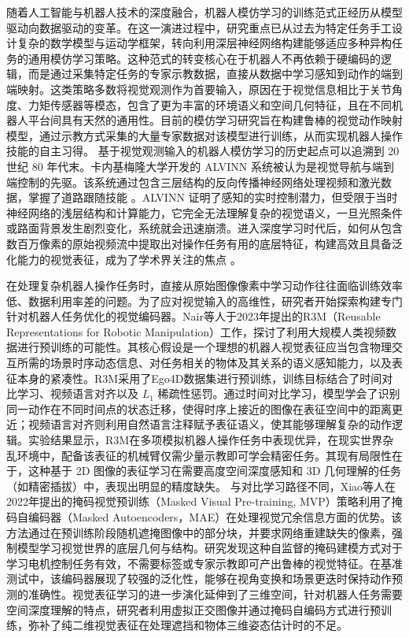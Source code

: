 随着人工智能与机器人技术的深度融合，机器人模仿学习的训练范式正经历从模型驱动向数据驱动的变革。在这一演进过程中，研究重点已从过去为特定任务手工设计复杂的数学模型与运动学框架，转向利用深层神经网络构建能够适应多种异构任务的通用模仿学习策略。这种范式的转变核心在于机器人不再依赖于硬编码的逻辑，而是通过采集特定任务的专家示教数据，直接从数据中学习感知到动作的端到端映射。这类策略多数将视觉观测作为首要输入，原因在于视觉信息相比于关节角度、力矩传感器等模态，包含了更为丰富的环境语义和空间几何特征，且在不同机器人平台间具有天然的通用性。目前的模仿学习研究旨在构建鲁棒的视觉动作映射模型，通过示教方式采集的大量专家数据对该模型进行训练，从而实现机器人操作技能的自主习得。
基于视觉观测输入的机器人模仿学习的历史起点可以追溯到 20 世纪 80 年代末。卡内基梅隆大学开发的 ALVINN\cite{pomerleau1988alvinn} 系统被认为是视觉导航与端到端控制的先驱。该系统通过包含三层结构的反向传播神经网络处理视频和激光数据，掌握了道路跟随技能 。ALVINN 证明了感知的实时控制潜力，但受限于当时神经网络的浅层结构和计算能力，它完全无法理解复杂的视觉语义，一旦光照条件或路面背景发生剧烈变化，系统就会迅速崩溃。进入深度学习时代后，如何从包含数百万像素的原始视频流中提取出对操作任务有用的底层特征，构建高效且具备泛化能力的视觉表征，成为了学术界关注的焦点 。

在处理复杂机器人操作任务时，直接从原始图像像素中学习动作往往面临训练效率低、数据利用率差的问题。为了应对视觉输入的高维性，研究者开始探索构建专门针对机器人任务优化的视觉编码器。Nair等人于2023年提出的R3M（Reusable Representations for Robotic Manipulation）工作\cite{nair2023r3m}，探讨了利用大规模人类视频数据进行预训练的可能性。其核心假设是一个理想的机器人视觉表征应当包含物理交互所需的场景时序动态信息、对任务相关的物体及其关系的语义感知能力，以及表征本身的紧凑性。R3M采用了Ego4D数据集\cite{grauman2022ego4d}进行预训练，训练目标结合了时间对比学习、视频语言对齐\cite{radford2021learning}以及 $L_1$ 稀疏性惩罚。通过时间对比学习，模型学会了识别同一动作在不同时间点的状态迁移，使得时序上接近的图像在表征空间中的距离更近；视频语言对齐则利用自然语言注释赋予表征语义，使其能够理解复杂的动作逻辑。实验结果显示，R3M在多项模拟机器人操作任务中表现优异，在现实世界杂乱环境中，配备该表征的机械臂仅需少量示教即可学会精密任务。其现有局限性在于，这种基于 2D 图像的表征学习在需要高度空间深度感知和 3D 几何理解的任务（如精密插拔）中，表现出明显的精度缺失。
与对比学习路径不同，Xiao等人在2022年提出的掩码视觉预训练（Masked Visual Pre-training, MVP）策略\cite{radosavovic2023real}利用了掩码自编码器（Masked Autoencoders，MAE）\cite{he2022masked}在处理视觉冗余信息方面的优势。该方法通过在预训练阶段随机遮掩图像中的部分块，并要求网络重建缺失的像素，强制模型学习视觉世界的底层几何与结构。研究发现这种自监督的掩码建模方式对于学习电机控制任务有效，不需要标签或专家示教即可产出鲁棒的视觉特征。在基准测试中，该编码器展现了较强的泛化性，能够在视角变换和场景更迭时保持动作预测的准确性。视觉表征学习的进一步演化延伸到了三维空间，针对机器人任务需要空间深度理解的特点，研究者利用虚拟正交图像并通过掩码自编码方式进行预训练，弥补了纯二维视觉表征在处理遮挡和物体三维姿态估计时的不足。

